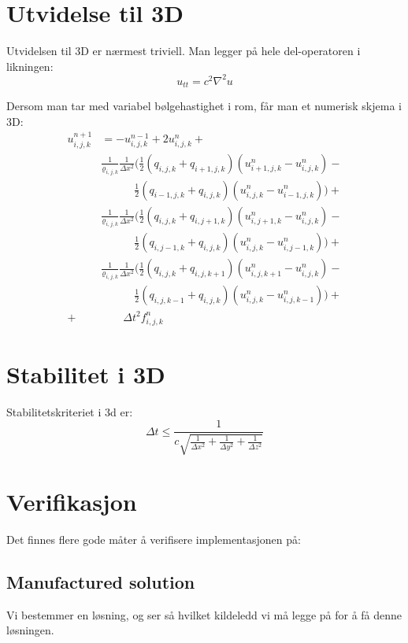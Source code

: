 \documentclass[a4paper, 10pt]{article}
\begin{document}
\section{Utvidelse til 3D}
Utvidelsen til 3D er nærmest triviell. Man legger på hele del-operatoren i likningen:
\begin{equation}
	u_{tt} = c^2 \nabla^2 u
\end{equation}

Dersom man tar med variabel bølgehastighet i rom, får man et numerisk skjema i 3D:
\begin{align*}
u^{n+1}_{i,j,k} &= - u^{n-1}_{i,j,k}  + 2u^{n}_{i,j,k} + \\ 
 & \frac{1}{\varrho_{i,j,k}}\frac{1}{\Delta x^2} ( \frac{1}{2}(q_{i,j,k} + q_{i+1,j,k})(u^{n}_{i+1,j,k} - u^{n}_{i,j,k}) - \\ 
&\qquad\quad \frac{1}{2}(q_{i-1,j,k} + q_{i,j,k})(u^{n}_{i,j,k} - u^{n}_{i-1,j,k})) + \\ 
 & \frac{1}{\varrho_{i,j,k}}\frac{1}{\Delta x^2} ( \frac{1}{2}(q_{i,j,k} + q_{i,j+1,k})(u^{n}_{i,j+1,k} - u^{n}_{i,j,k}) - \\ 
&\qquad\quad\frac{1}{2}(q_{i,j-1,k} + q_{i,j,k})(u^{n}_{i,j,k} - u^{n}_{i,j-1,k})) + \\ 
 & \frac{1}{\varrho_{i,j,k}}\frac{1}{\Delta x^2} ( \frac{1}{2}(q_{i,j,k} + q_{i,j,k+1})(u^{n}_{i,j,k+1} - u^{n}_{i,j,k}) -\\ 
&\qquad\quad \frac{1}{2}(q_{i,j,k-1} + q_{i,j,k})(u^{n}_{i,j,k} - u^{n}_{i,j,k-1})) + \\ 
+ &\qquad \Delta t^2 f^n_{i,j,k}
\end{align*}

\section{Stabilitet i 3D}
Stabilitetskriteriet i 3d er:
\begin{equation}
	 \Delta t \leq \frac{1}{c \sqrt{ \frac{1}{\Delta x^2} + \frac{1}{\Delta y^2} + \frac{1}{\Delta z^2}}}
\end{equation}

\section{Verifikasjon}
Det finnes flere gode måter å verifisere implementasjonen på:

\subsection{Manufactured solution}
Vi bestemmer en løsning, og ser så hvilket kildeledd vi må legge på for å få denne løsningen. 
\end{document}
